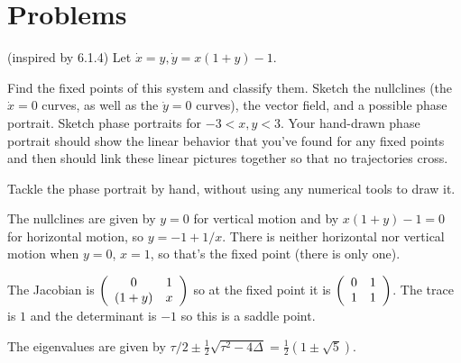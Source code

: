 \documentclass[12pt,letterpaper]{exam}
\begin{document}
\section*{Problems}


\begin{questions}

\question (inspired by 6.1.4) Let $\dot{x} = y, \dot{y} = x(1+y)-1$.  
\begin{parts}
\item Find the fixed points of this system and classify them.  Sketch the nullclines (the $\dot{x} = 0$ curves, as well as the $\dot{y} = 0$ curves), the vector field, and a possible phase portrait.  Sketch phase portraits for $-3<x,y<3$.  Your hand-drawn phase portrait should show the linear behavior that you've found for any fixed points and then should link these linear pictures together so that no trajectories cross.

Tackle the phase portrait by hand, without using any numerical tools to draw it.

\begin{solution}
The nullclines are given by $y = 0$ for vertical motion and by $x(1+y) - 1 = 0$ for horizontal motion, so $y = -1 + 1/x$.  There is neither horizontal nor vertical motion when $y = 0$, $x = 1$, so that's the fixed point (there is only one).

The Jacobian is $\left(\begin{array}{c c} 0 & 1 \\ (1+y) & x \end{array}\right)$ so at the fixed point it is $\left(\begin{array}{c c} 0 & 1 \\ 1 & 1 \end{array}\right)$.  The trace is $1$ and the determinant is $-1$ so this is a saddle point.

The eigenvalues are given by $\tau/2 \pm \frac{1}{2}\sqrt{\tau^2 - 4\Delta} = \frac{1}{2}(1 \pm \sqrt{5})$.


\end{solution}
\end{parts}
\end{questions}
\end{document}
